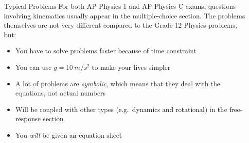 \documentclass[12pt,compress,aspectratio=169]{beamer}
\begin{document}
\begin{frame}{Typical Problems}
  For both AP Physics 1 and AP Physics C exams, questions involving kinematics
  usually appear in the multiple-choice section. The problems themselves are
  not very different compared to the Grade 12 Physics problems, but:
  \begin{itemize}
  \item You have to solve problems faster because of time constraint
  \item You can use $g=\SI{10}{m/s^2}$ to make your lives simpler
  \item A lot of problems are \emph{symbolic}, which means that they deal with
    the equations, not actual numbers
  \item Will be coupled with other types (e.g.\ dynamics and rotational) in
    the free-response section
  \item You \emph{will} be given an equation sheet
  \end{itemize}
\end{frame}
\end{document}
